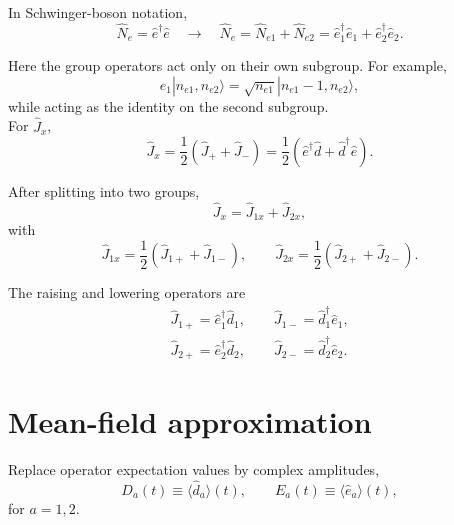 \documentclass[11pt]{article}
\begin{document}
In Schwinger-boson notation,
\begin{equation}
\hat{N}_e
=
\hat{e}^{\dagger}\hat{e}
\quad
\rightarrow
\quad
\hat{N}_e
=
\hat{N}_{e1}
+
\hat{N}_{e2}
=
\hat{e}_1^{\dagger}\hat{e}_1
+
\hat{e}_2^{\dagger}\hat{e}_2.
\end{equation}

Here the group operators act only on their own subgroup. For example,
\begin{equation}
\hat{e}_1 |n_{e1},n_{e2}\rangle
=
\sqrt{n_{e1}}
|n_{e1}-1,n_{e2}\rangle,
\end{equation}
while acting as the identity on the second subgroup.
\\

For \(\hat{J}_x\),
\begin{equation}
\hat{J}_x
=
\frac{1}{2}
(
\hat{J}_{+}
+
\hat{J}_{-}
)
=
\frac{1}{2}
(
\hat{e}^{\dagger}\hat{d}
+
\hat{d}^{\dagger}\hat{e}
).
\end{equation}

After splitting into two groups,
\begin{equation}
\hat{J}_x
=
\hat{J}_{1x}
+
\hat{J}_{2x},
\end{equation}
with
\begin{equation}
\hat{J}_{1x}
=
\frac{1}{2}
(
\hat{J}_{1+}
+
\hat{J}_{1-}
),
\qquad
\hat{J}_{2x}
=
\frac{1}{2}
(
\hat{J}_{2+}
+
\hat{J}_{2-}
).
\end{equation}

The raising and lowering operators are
\begin{equation} 
\begin{aligned}
\hat{J}_{1+}
=
\hat{e}_1^{\dagger}\hat{d}_1,
\qquad
\hat{J}_{1-}
=
\hat{d}_1^{\dagger}\hat{e}_1,
\\
\hat{J}_{2+}
=
\hat{e}_2^{\dagger}\hat{d}_2,
\qquad
\hat{J}_{2-}
=
\hat{d}_2^{\dagger}\hat{e}_2.
\end{aligned}
\end{equation}



\section{Mean-field approximation}

Replace operator expectation values by complex amplitudes,
\begin{equation}
D_a(t)
\equiv
\langle \hat{d}_a\rangle(t),
\qquad
E_a(t)
\equiv
\langle \hat{e}_a\rangle(t),
\end{equation}
for \(a=1,2\).
\\
\end{document}
